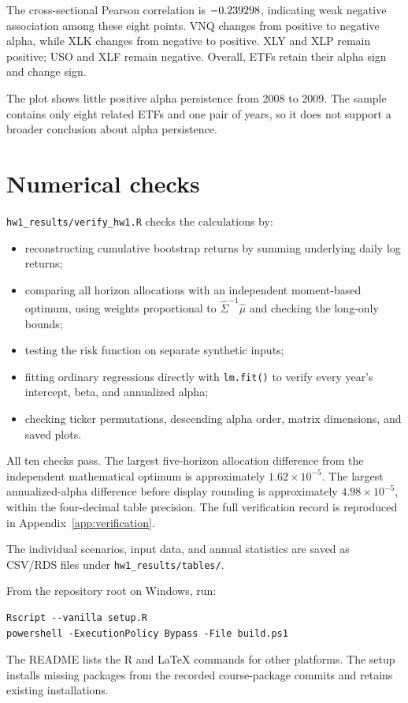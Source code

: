 \documentclass[11pt,letterpaper]{article}
\begin{document}
The cross-sectional Pearson correlation is $-0.239298$,
indicating weak negative association among these eight points. VNQ changes
from positive to negative alpha, while XLK changes from negative to positive.
XLY and XLP remain positive; USO and XLF remain negative. Overall,
\HWAlphaSignSameCount{} ETFs retain their alpha sign and
\HWAlphaSignChangedCount{} change sign.

The plot shows little positive alpha persistence from 2008 to 2009. The
sample contains only eight related ETFs and one pair of years, so it does
not support a broader conclusion about alpha persistence.

\section{Numerical checks}
\texttt{hw1\_results/verify\_hw1.R} checks the calculations by:
\begin{itemize}
\item reconstructing cumulative bootstrap returns by summing underlying
daily log returns;
\item comparing all horizon allocations with an independent moment-based
optimum, using weights proportional to $\widehat\Sigma^{-1}\widehat\mu$
and checking the long-only bounds;
\item testing the risk function on separate synthetic inputs;
\item fitting ordinary regressions directly with \texttt{lm.fit()} to
verify every year's intercept, beta, and annualized alpha;
\item checking ticker permutations, descending alpha order, matrix
dimensions, and saved plots.
\end{itemize}

All ten checks pass. The largest five-horizon allocation difference from the
independent mathematical optimum is approximately $1.62\times10^{-5}$.
The largest annualized-alpha difference before display rounding is
approximately $4.98\times10^{-5}$, within the four-decimal table precision.
The full verification record is reproduced in Appendix~\ref{app:verification}.

The individual scenarios, input data, and annual statistics are saved as
CSV/RDS files under \texttt{hw1\_results/tables/}.

From the repository root on Windows, run:
\begin{lstlisting}[numbers=none]
Rscript --vanilla setup.R
powershell -ExecutionPolicy Bypass -File build.ps1
\end{lstlisting}
The README lists the R and LaTeX commands for other platforms. The setup
installs missing packages from the recorded course-package commits and
retains existing installations.
\end{document}
